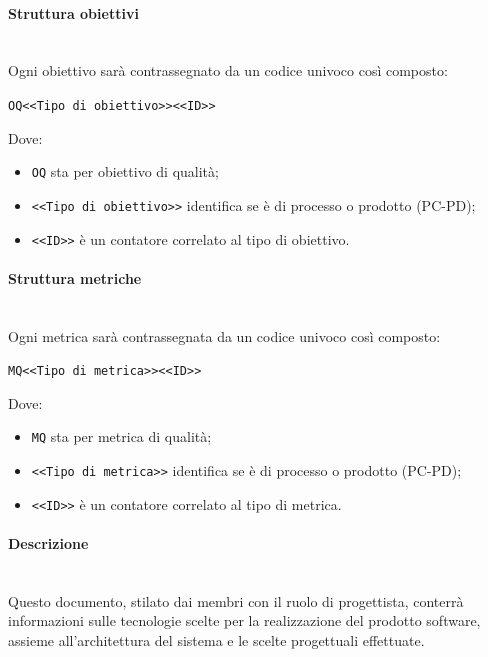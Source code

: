 \paragraph {Struttura obiettivi}\mbox{}\\
Ogni obiettivo sarà contrassegnato da un codice univoco così composto:
\begin{center}
	\verb|OQ<<Tipo di obiettivo>><<ID>>|
\end{center}
Dove:
\begin{itemize}
	\item \verb|OQ| sta per obiettivo di qualità;
	\item \verb|<<Tipo di obiettivo>>| identifica se è di processo o prodotto (PC-PD);
	\item \verb|<<ID>>| è un contatore correlato al tipo di obiettivo.
\end{itemize}
\paragraph {Struttura metriche}\mbox{}\\
Ogni metrica sarà contrassegnata da un codice univoco così composto:
\begin{center}
	\verb|MQ<<Tipo di metrica>><<ID>>|
\end{center}
Dove:
\begin{itemize}
	\item \verb|MQ| sta per metrica di qualità;
	\item \verb|<<Tipo di metrica>>| identifica se è di processo o prodotto (PC-PD);
	\item \verb|<<ID>>| è un contatore correlato al tipo di metrica.
\end{itemize}

\paragraph {Descrizione}\mbox{}\\
Questo documento, stilato dai membri con il ruolo di progettista, conterrà informazioni sulle tecnologie scelte per la realizzazione del prodotto software, assieme all'architettura del sistema e le scelte progettuali effettuate.
